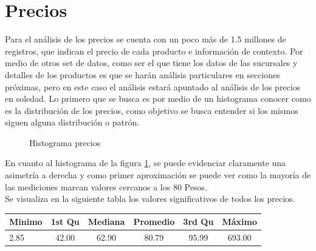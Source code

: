 \section{Precios}

Para el análisis de los precios se cuenta con un poco más de 1.5 millones de registros, que indican el precio de cada producto e información de contexto. Por medio de otros set de datos, como ser el que tiene los datos de las sucursales y detalles de los productos es que se harán análisis particulares en secciones próximas, pero en este caso el análisis estará apuntado al análisis de los precios en soledad.
Lo primero que se busca es por medio de un histograma conocer como es la distribución de los precios, como objetivo se busca entender si los mismos siguen alguna distribución o patrón.

\begin{figure}[h]
\centering
{}%
\caption{Histograma precios}
\label{histograma}
\end{figure}


En cuanto al histograma de la figura \ref{histograma}, se puede evidenciar claramente una asimetría a derecha y como primer aproximación se puede ver como la mayoría de las mediciones marcan valores cercanos a los 80 Pesos.\\
Se visualiza en la siguiente tabla los valores significativos de todos los precios.\\

\begin{center}
 \begin{tabular}{||l c c c c c||} 
 \hline
 Minimo & 1st Qu & Mediana & Promedio & 3rd Qu & Máximo \\ [0.5ex] 
 \hline\hline
 2.85 & 42.00 & 62.90 & 80.79 & 95.99 & 693.00 \\ 
 \hline
 \hline
\end{tabular}
\end{center}

